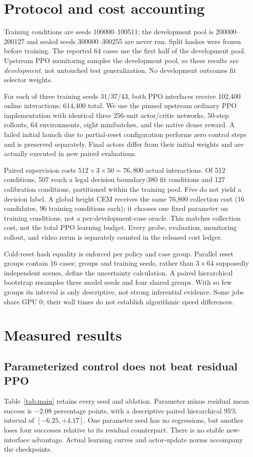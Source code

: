 \documentclass[10pt,a4paper,twocolumn]{article}
\begin{document}
\section{Protocol and cost accounting}
Training conditions are seeds 100000--100511; the development pool is 200000--200127 and sealed seeds 300000--300255 are never run. Split hashes were frozen before training. The reported 64 cases use the first half of the development pool. Upstream PPO monitoring samples the development pool, so these results are \emph{development}, not untouched test generalization. No development outcomes fit selector weights.

For each of three training seeds 31/37/43, both PPO interfaces receive 102,400 online interactions: 614,400 total. We use the pinned upstream ordinary PPO implementation with identical three 256-unit actor/critic networks, 50-step rollouts, 64 environments, eight minibatches, and the native dense reward. A failed initial launch due to partial-reset configuration performs zero control steps and is preserved separately. Final actors differ from their initial weights and are actually executed in new paired evaluations.

Paired supervision costs $512\times 3\times 50=76,800$ actual interactions. Of 512 conditions, 507 reach a legal decision boundary:380 fit conditions and 127 calibration conditions, partitioned within the training pool. Five do not yield a decision label. A global height CEM receives the same 76,800 collection cost (16 candidates, 96 training conditions each); it chooses one fixed parameter on training conditions, not a per-development-case oracle. This matches collection cost, not the total PPO learning budget. Every probe, evaluation, monitoring rollout, and video rerun is separately counted in the released cost ledger.

Cold-reset hash equality is enforced per policy and case group. Parallel reset groups contain 16 cases; groups and training seeds, rather than $3\times 64$ supposedly independent scenes, define the uncertainty calculation. A paired hierarchical bootstrap resamples three model seeds and four shared groups. With so few groups its interval is only descriptive, not strong inferential evidence. Some jobs share GPU 0; their wall times do not establish algorithmic speed differences.

\section{Measured results}
\subsection{Parameterized control does not beat residual PPO}
Table~\ref{tab:main} retains every seed and ablation. Parameter minus residual mean success is $-2.08$ percentage points, with a descriptive paired hierarchical 95\% interval of $[-6.25,+4.17]$. One parameter seed has no regressions, but another loses four successes relative to its residual counterpart. There is no stable new-interface advantage. Actual learning curves and actor-update norms accompany the checkpoints.
\end{document}
